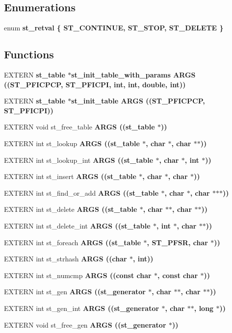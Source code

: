 \subsection*{Enumerations}
\begin{CompactItemize}
\item 
enum \bf{st\_\-retval} \{ \bf{ST\_\-CONTINUE}, 
\bf{ST\_\-STOP}, 
\bf{ST\_\-DELETE}
 \}
\end{CompactItemize}
\subsection*{Functions}
\begin{CompactItemize}
\item 
EXTERN \bf{st\_\-table} $\ast$st\_\-init\_\-table\_\-with\_\-params \bf{ARGS} ((\bf{ST\_\-PFICPCP}, \bf{ST\_\-PFICPI}, int, int, double, int))
\item 
EXTERN \bf{st\_\-table} $\ast$st\_\-init\_\-table \bf{ARGS} ((\bf{ST\_\-PFICPCP}, \bf{ST\_\-PFICPI}))
\item 
EXTERN void st\_\-free\_\-table \bf{ARGS} ((\bf{st\_\-table} $\ast$))
\item 
EXTERN int st\_\-lookup \bf{ARGS} ((\bf{st\_\-table} $\ast$, char $\ast$, char $\ast$$\ast$))
\item 
EXTERN int st\_\-lookup\_\-int \bf{ARGS} ((\bf{st\_\-table} $\ast$, char $\ast$, int $\ast$))
\item 
EXTERN int st\_\-insert \bf{ARGS} ((\bf{st\_\-table} $\ast$, char $\ast$, char $\ast$))
\item 
EXTERN int st\_\-find\_\-or\_\-add \bf{ARGS} ((\bf{st\_\-table} $\ast$, char $\ast$, char $\ast$$\ast$$\ast$))
\item 
EXTERN int st\_\-delete \bf{ARGS} ((\bf{st\_\-table} $\ast$, char $\ast$$\ast$, char $\ast$$\ast$))
\item 
EXTERN int st\_\-delete\_\-int \bf{ARGS} ((\bf{st\_\-table} $\ast$, int $\ast$, char $\ast$$\ast$))
\item 
EXTERN int st\_\-foreach \bf{ARGS} ((\bf{st\_\-table} $\ast$, \bf{ST\_\-PFSR}, char $\ast$))
\item 
EXTERN int st\_\-strhash \bf{ARGS} ((char $\ast$, int))
\item 
EXTERN int st\_\-numcmp \bf{ARGS} ((const char $\ast$, const char $\ast$))
\item 
EXTERN int st\_\-gen \bf{ARGS} ((\bf{st\_\-generator} $\ast$, char $\ast$$\ast$, char $\ast$$\ast$))
\item 
EXTERN int st\_\-gen\_\-int \bf{ARGS} ((\bf{st\_\-generator} $\ast$, char $\ast$$\ast$, long $\ast$))
\item 
EXTERN void st\_\-free\_\-gen \bf{ARGS} ((\bf{st\_\-generator} $\ast$))
\end{CompactItemize}
